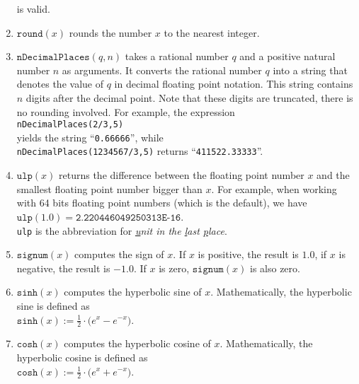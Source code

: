 \begin{enumerate}
      is valid.
\item $\texttt{round}(x)$ rounds the number $x$ to the nearest integer.
\item $\texttt{nDecimalPlaces}(q, n)$ takes a rational number $q$ and a positive natural
      number $n$ as arguments.  It converts the rational number $q$ into a string that denotes the
      value of $q$ in decimal floating point notation.  This string contains $n$ digits after the
      decimal point.  Note that these digits are truncated, there is no rounding
      involved.  For example, the expression
      \\[0.2cm]
      \hspace*{1.3cm}
      \texttt{nDecimalPlaces(2/3,5)}
      \\[0.2cm]
      yields the string ``\texttt{0.66666}'', while 
      \\[0.2cm]
      \hspace*{1.3cm}
      \texttt{nDecimalPlaces(1234567/3,5)} returns ``\texttt{411522.33333}''.
\item $\mathtt{ulp}(x)$  returns the difference between the floating point number $x$ and
      the smallest floating point number bigger than $x$.  For example, when working with
      64 bits floating point numbers (which is the default), we have
      \\[0.2cm]
      \hspace*{1.3cm}
      $\mathtt{ulp}(1.0) = \texttt{2.220446049250313E-16}$.
      \\[0.2cm]
      \texttt{ulp} is the abbreviation for 
      \emph{\underline{u}nit in the \underline{l}ast \underline{p}lace}. 
\item $\mathtt{signum}(x)$ computes the sign of $x$.  If $x$ is positive, the result is
      $1.0$, if $x$ is negative, the result is $-1.0$.  If $x$ is zero,
      $\mathtt{signum}(x)$ is also zero.
\item $\texttt{sinh}(x)$ computes the hyperbolic sine of $x$.  Mathematically, the
      hyperbolic sine is defined as 
      \\[0.2cm]
      \hspace*{1.3cm}
      $\mathtt{sinh}(x) := \frac{1}{2} \cdot \bigl(e^x - e^{-x}\bigr)$.
\item $\texttt{cosh}(x)$ computes the hyperbolic cosine of $x$.  Mathematically, the
      hyperbolic cosine is defined as 
      \\[0.2cm]
      \hspace*{1.3cm}
      $\mathtt{cosh}(x) := \frac{1}{2} \cdot \bigl(e^x + e^{-x}\bigr)$.

\end{enumerate}
